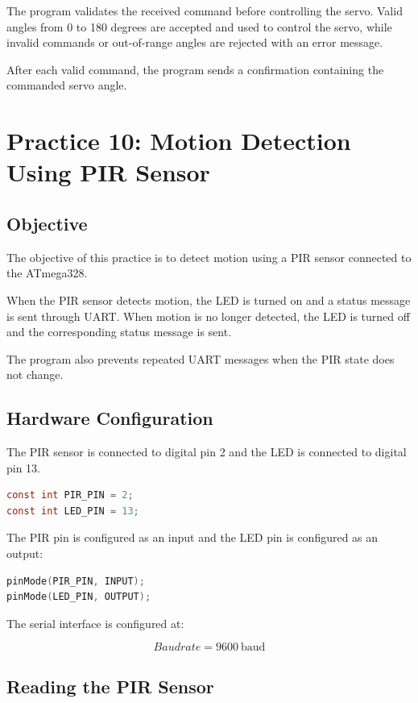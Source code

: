 \documentclass[12pt,a4paper]{article}
\begin{document}
The program validates the received command before controlling the
servo. Valid angles from 0 to 180 degrees are accepted and used to
control the servo, while invalid commands or out-of-range angles are
rejected with an error message.

After each valid command, the program sends a confirmation containing
the commanded servo angle.


\section{Practice 10: Motion Detection Using PIR Sensor}

\subsection{Objective}

The objective of this practice is to detect motion using a PIR sensor
connected to the ATmega328.

When the PIR sensor detects motion, the LED is turned on and a status
message is sent through UART. When motion is no longer detected, the
LED is turned off and the corresponding status message is sent.

The program also prevents repeated UART messages when the PIR state
does not change.

\subsection{Hardware Configuration}

The PIR sensor is connected to digital pin 2 and the LED is connected
to digital pin 13.

\begin{lstlisting}[language=C]
const int PIR_PIN = 2;
const int LED_PIN = 13;
\end{lstlisting}

The PIR pin is configured as an input and the LED pin is configured as
an output:

\begin{lstlisting}[language=C]
pinMode(PIR_PIN, INPUT);
pinMode(LED_PIN, OUTPUT);
\end{lstlisting}

The serial interface is configured at:

\[
Baudrate = 9600\ \mathrm{baud}
\]

\subsection{Reading the PIR Sensor}
\end{document}
